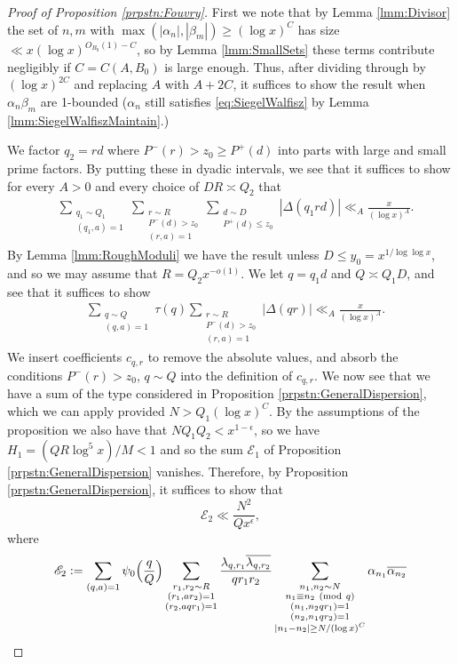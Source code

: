 \documentclass[10pt]{amsart}
\theoremstyle{plain}
\numberwithin{equation}{section}
\newcommand{\Mod}[1]{\ (\mathrm{mod}\ #1)}
\begin{document}
\begin{proof}[Proof of Proposition \ref{prpstn:Fouvry}]
First we note that by Lemma \ref{lmm:Divisor} the set of $n,m$ with $\max(|\alpha_n|,|\beta_m|)\ge(\log{x})^C$ has size $\ll x(\log{x})^{O_{B_0}(1)-C}$, so by Lemma \ref{lmm:SmallSets} these terms contribute negligibly if $C=C(A,B_0)$ is large enough. Thus, after dividing through by $(\log{x})^{2C}$ and replacing $A$ with $A+2C$, it suffices to show the result when $\alpha_n\beta_m$ are 1-bounded ($\alpha_n$ still satisfies \eqref{eq:SiegelWalfisz} by Lemma \ref{lmm:SiegelWalfiszMaintain}.)

We factor $q_2=r d$ where $P^-(r)>z_0\ge P^+(d)$ into parts with large and small prime factors. By putting these in dyadic intervals, we see that it suffices to show for every $A>0$ and every choice of $D R\asymp Q_2$ that
 \begin{align*}
 &\sum_{\substack{q_1\sim Q_1\\ (q_1,a)=1}}\sum_{\substack{r\sim R\\ P^-(d)>z_0\\ (r,a)=1}}\sum_{\substack{d\sim D\\ P^+(d)\le z_0}}|\Delta(q_1 r d)|\ll_{A}\frac{x}{(\log{x})^A}.
 \end{align*}
By Lemma \ref{lmm:RoughModuli} we have the result unless $D\le y_0=x^{1/\log\log{x}}$, and so we may assume that $R=Q_2x^{-o(1)}$. We let $q=q_1d$ and $Q\asymp Q_1D$, and see that it suffices to show
 \begin{align*}
 &\sum_{\substack{q\sim Q\\ (q,a)=1}}\tau(q)\sum_{\substack{r\sim R\\ P^-(d)>z_0\\ (r,a)=1}}|\Delta(q r)|\ll_{A}\frac{x}{(\log{x})^A}.
 \end{align*}
We insert coefficients $c_{q,r}$ to remove the absolute values, and absorb the conditions $P^-(r)>z_0$, $q\sim Q$ into the definition of $c_{q,r}$. We now see that we have a sum of the type considered in Proposition \ref{prpstn:GeneralDispersion}, which we can apply provided $N>Q_1(\log{x})^C$. By the assumptions of the proposition we also have that $N Q_1 Q_2<x^{1-\epsilon}$, so we have $H_1=(Q R\log^5{x})/M<1$ and so the sum $\mathscr{E}_1$ of Proposition \ref{prpstn:GeneralDispersion} vanishes. Therefore, by Proposition \ref{prpstn:GeneralDispersion}, it suffices to show that
\[
\mathscr{E}_2\ll \frac{N^2}{Q x^\epsilon},
\]
where
\begin{align*}
\mathscr{E}_2&:=\sum_{ (q,a)=1}\psi_0\Bigl(\frac{q}{Q}\Bigr)\sum_{\substack{r_1,r_2\sim R\\ (r_1,a r_2)=1\\ (r_2,a q r_1)=1}}\frac{\lambda_{q,r_1}\overline{\lambda_{q,r_2}}}{q r_1 r_2}\sum_{\substack{n_1,n_2\sim N\\ n_1\equiv n_2\Mod{q}\\ (n_1,n_2 q r_1)=1\\(n_2,n_1 q r_2)=1\\ |n_1-n_2|\ge N/(\log{x})^C}}\alpha_{n_1}\overline{\alpha_{n_2}}\\

\end{align*}
\end{proof}
\end{document}
